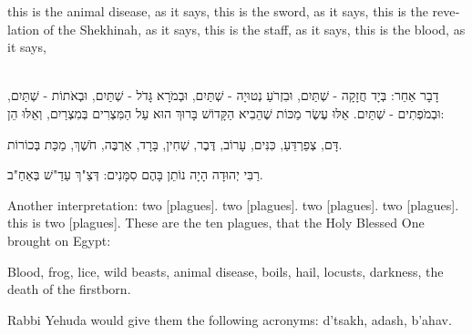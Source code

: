 \begin{english}
 this is the animal disease, as it says,   this is the sword, as it says,   this is the revelation of the Shekhinah, as it says,   this is the staff, as it says,    this is the blood, as it says, 
\end{english}

\ \\


דָבָר אַחֵר: בְּיָד חֲזָקָה - שְׁתַּיִם, וּבִזְרֹעַ נְטוּיָה - שְׁתַּיִם, וּבְמֹרָא גָּדֹל - שְׁתַּיִם, וּבְאֹתוֹת - שְׁתַּיִם, וּבְמֹפְתִים - שְׁתַּיִם. אֵלּוּ עֶשֶׂר מַכּוֹת שֶׁהֵבִיא הַקָּדוֹשׁ בָּרוּךְ הוּא עַל הַמִּצְרִים בְּמִצְרַיִם, וְאֵלּוּ הֵן:

דָּם, צְפַרְדֵּעַ, כִּנִּים, עָרוֹב, דֶּבֶר, שְׁחִין, בָּרָד, אַרְבֶּה, חֹשֶׁךְ, מַכַּת בְּכוֹרוֹת.

רַבִּי יְהוּדָה הָיָה נוֹתֵן בָּהֶם סִמָּנִים: דְּצַ"ךְ עַדַ"שׁ בְּאַחַ"ב.

\begin{english}
Another interpretation:  two [plagues].  two [plagues].  two [plagues].  two [plagues].  this is two [plagues]. These are the ten plagues, that the Holy Blessed One brought on Egypt:

Blood, frog, lice, wild beasts, animal disease, boils, hail, locusts, darkness, the death of the firstborn.

Rabbi Yehuda would give them the following acronyms: d'tsakh, adash, b'ahav.
\end{english}

